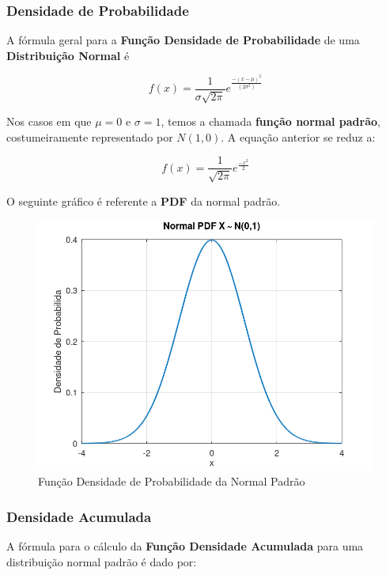 \documentclass[
]{book}
\begin{document}
\hypertarget{densidade-de-probabilidade}{%
\subsubsection*{Densidade de Probabilidade}\label{densidade-de-probabilidade}}

A fórmula geral para a \textbf{Função Densidade de Probabilidade} de uma \textbf{Distribuição Normal} é

\begin{equation}
  f(x) =  \frac{1}{\sigma \sqrt{2 \pi}} e^{\frac{-(x-\mu)^2}{(2\sigma^2)}}
\end{equation}

Nos casos em que \(\mu = 0\) e \(\sigma = 1\), temos a chamada \textbf{função normal padrão}, costumeiramente representado por \(N(1,0)\). A equação anterior se reduz a:

\begin{equation}
  f(x) = \frac{1}{\sqrt{2 \pi}} e^{\frac{-x^2}{2}}
\end{equation}

O seguinte gráfico é referente a \textbf{PDF} da normal padrão.

\begin{figure}

{\centering \includegraphics[width=0.5\linewidth]{images/normalpdf} 

}

\caption{Função Densidade de Probabilidade da Normal Padrão}\label{fig:unnamed-chunk-1}
\end{figure}

\hypertarget{densidade-acumulada}{%
\subsubsection*{Densidade Acumulada}\label{densidade-acumulada}}

A fórmula para o cálculo da \textbf{Função Densidade Acumulada} para uma distribuição normal padrão é dado por:
\end{document}
